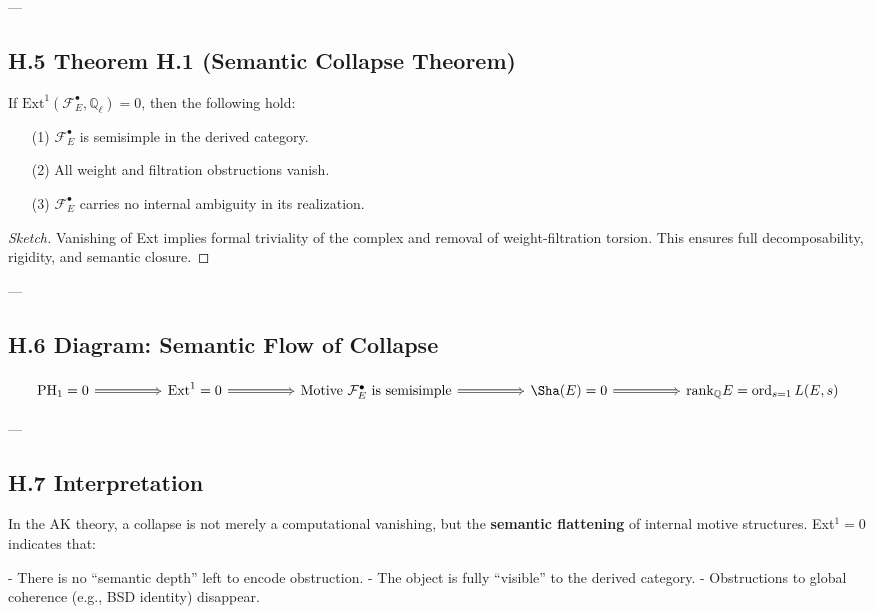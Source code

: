 ---

\subsection*{H.5 Theorem H.1 (Semantic Collapse Theorem)}

\begin{theorem}
If \( \mathrm{Ext}^1(\mathcal{F}_E^\bullet, \mathbb{Q}_\ell) = 0 \), then the following hold:
\begin{itemize}
  \item[(1)] \( \mathcal{F}_E^\bullet \) is semisimple in the derived category.
  \item[(2)] All weight and filtration obstructions vanish.
  \item[(3)] \( \mathcal{F}_E^\bullet \) carries no internal ambiguity in its realization.
\end{itemize}
\end{theorem}

\begin{proof}[Sketch]
Vanishing of Ext implies formal triviality of the complex and removal of weight-filtration torsion.  
This ensures full decomposability, rigidity, and semantic closure.
\end{proof}

---

\subsection*{H.6 Diagram: Semantic Flow of Collapse}

\[
\begin{tikzcd}[row sep=large, column sep=huge]
\mathrm{PH}_1 = 0 \arrow[r, Rightarrow] & 
\mathrm{Ext}^1 = 0 \arrow[r, Rightarrow] & 
\text{Motive } \mathcal{F}_E^\bullet \text{ is semisimple} \arrow[r, Rightarrow] & 
\Sha(E) = 0 \arrow[r, Rightarrow] & 
\mathrm{rank}_{\mathbb{Q}}E = \operatorname{ord}_{s=1}L(E,s)
\end{tikzcd}
\]

---

\subsection*{H.7 Interpretation}

In the AK theory, a collapse is not merely a computational vanishing,  
but the \textbf{semantic flattening} of internal motive structures.  
Ext$^1 = 0$ indicates that:

- There is no “semantic depth” left to encode obstruction.
- The object is fully “visible” to the derived category.
- Obstructions to global coherence (e.g., BSD identity) disappear.

